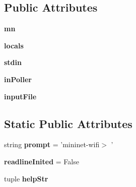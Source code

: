 \subsection*{Public Attributes}
\begin{DoxyCompactItemize}
\item 
\hypertarget{classmininet_1_1cli_1_1CLI_a0126b20d4775a134b1e06e591af3f05e}{{\bfseries mn}}\label{classmininet_1_1cli_1_1CLI_a0126b20d4775a134b1e06e591af3f05e}

\item 
\hypertarget{classmininet_1_1cli_1_1CLI_a7594e2ff92c24a6b1d24ad891acdf74f}{{\bfseries locals}}\label{classmininet_1_1cli_1_1CLI_a7594e2ff92c24a6b1d24ad891acdf74f}

\item 
\hypertarget{classmininet_1_1cli_1_1CLI_aebbab6e46fd3edc1ea8b2cfff39ce12c}{{\bfseries stdin}}\label{classmininet_1_1cli_1_1CLI_aebbab6e46fd3edc1ea8b2cfff39ce12c}

\item 
\hypertarget{classmininet_1_1cli_1_1CLI_ad5509db5a4e78c91f5f9b7da53693690}{{\bfseries in\-Poller}}\label{classmininet_1_1cli_1_1CLI_ad5509db5a4e78c91f5f9b7da53693690}

\item 
\hypertarget{classmininet_1_1cli_1_1CLI_afa57f558f8e90790a94d325af8db5818}{{\bfseries input\-File}}\label{classmininet_1_1cli_1_1CLI_afa57f558f8e90790a94d325af8db5818}

\end{DoxyCompactItemize}
\subsection*{Static Public Attributes}
\begin{DoxyCompactItemize}
\item 
\hypertarget{classmininet_1_1cli_1_1CLI_a343818ddcc27d8942a1316156c1f246c}{string {\bfseries prompt} = 'mininet-\/wifi$>$ '}\label{classmininet_1_1cli_1_1CLI_a343818ddcc27d8942a1316156c1f246c}

\item 
\hypertarget{classmininet_1_1cli_1_1CLI_a7fee306d59e2df221b8e7f7a9c189737}{{\bfseries readline\-Inited} = False}\label{classmininet_1_1cli_1_1CLI_a7fee306d59e2df221b8e7f7a9c189737}

\item 
tuple {\bfseries help\-Str}
\end{DoxyCompactItemize}


